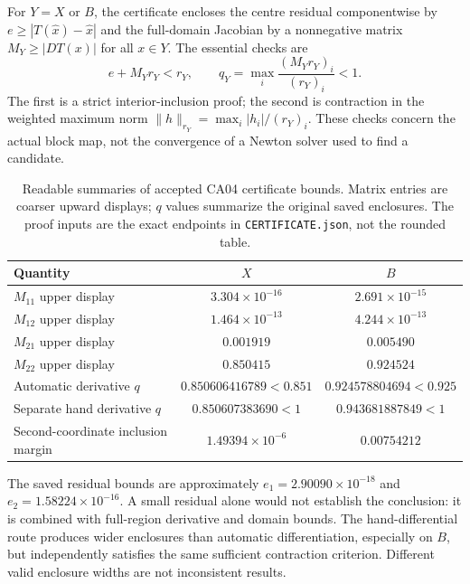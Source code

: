 \documentclass[11pt,a4paper]{article}
\numberwithin{equation}{section}
\begin{document}
For $Y=X$ or $B$, the certificate encloses the centre residual componentwise by $e\ge|T(\widehat x)-\widehat x|$ and the full-domain Jacobian by a nonnegative matrix $M_Y\ge|DT(x)|$ for all $x\in Y$. The essential checks are
\begin{equation}\label{eq:certificateineq}
e+M_Yr_Y<r_Y,\qquad
q_Y=\max_i\frac{(M_Yr_Y)_i}{(r_Y)_i}<1.
\end{equation}
The first is a strict interior-inclusion proof; the second is contraction in the weighted maximum norm $\|h\|_{r_Y}=\max_i|h_i|/(r_Y)_i$. These checks concern the actual block map, not the convergence of a Newton solver used to find a candidate.

\begin{table}[htbp]
\centering\small
\caption{Readable summaries of accepted CA04 certificate bounds. Matrix entries are coarser upward displays; $q$ values summarize the original saved enclosures. The proof inputs are the exact endpoints in \texttt{CERTIFICATE.json}, not the rounded table.}\label{tab:certificate}
\begin{tabular}{lcc}
\toprule
Quantity & $X$ & $B$ \\
\midrule
$M_{11}$ upper display & $3.304\times10^{-16}$ & $2.691\times10^{-15}$ \\
$M_{12}$ upper display & $1.464\times10^{-13}$ & $4.244\times10^{-13}$ \\
$M_{21}$ upper display & $0.001919$ & $0.005490$ \\
$M_{22}$ upper display & $0.850415$ & $0.924524$ \\
Automatic derivative $q$ & $0.850606416789<0.851$ & $0.924578804694<0.925$ \\
Separate hand derivative $q$ & $0.850607383690<1$ & $0.943681887849<1$ \\
Second-coordinate inclusion margin & $1.49394\times10^{-6}$ & $0.00754212$ \\
\bottomrule
\end{tabular}
\end{table}

The saved residual bounds are approximately $e_1=2.90090\times10^{-18}$ and $e_2=1.58224\times10^{-16}$. A small residual alone would not establish the conclusion: it is combined with full-region derivative and domain bounds. The hand-differential route produces wider enclosures than automatic differentiation, especially on $B$, but independently satisfies the same sufficient contraction criterion. Different valid enclosure widths are not inconsistent results.
\end{document}

